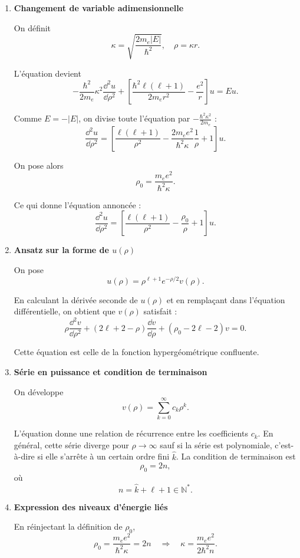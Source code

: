 \documentclass[a4paper,10pt]{report}
\begin{document}
\begin{enumerate}
		\item \textbf{Changement de variable adimensionnelle}
		
		On définit 
		\[
		\kappa = \sqrt{\frac{2m_e |E|}{\hbar^2}}, \quad \rho = \kappa r.
		\]
		
		L’équation devient
		\[
		-\frac{\hbar^2}{2m_e} \kappa^2 \frac{\dd^2 u}{\dd \rho^2} + \left[ \frac{\hbar^2 \ell(\ell+1)}{2m_e r^2} - \frac{e^2}{r} \right] u = E u.
		\]
		
		Comme $E = -|E|$, on divise toute l'équation par $-\frac{\hbar^2 \kappa^2}{2m_e}$ :
		\[
		\frac{\dd^2 u}{\dd \rho^2} = \left[ \frac{\ell(\ell+1)}{\rho^2} - \frac{2m_e e^2}{\hbar^2 \kappa} \frac{1}{\rho} + 1 \right] u.
		\]
		
		On pose alors 
		\[
		\rho_0 = \frac{m_e e^2}{\hbar^2 \kappa}.
		\]
		
		Ce qui donne l’équation annoncée :
		\[
		\frac{\dd^2 u}{\dd \rho^2} = \left[ \frac{\ell(\ell+1)}{\rho^2} - \frac{\rho_0}{\rho} + 1 \right] u.
		\]
		
		\item \textbf{Ansatz sur la forme de $u(\rho)$}
		
		On pose
		\[
		u(\rho) = \rho^{\ell+1} e^{-\rho/2} v(\rho).
		\]
		
		En calculant la dérivée seconde de $u(\rho)$ et en remplaçant dans l'équation différentielle, on obtient que $v(\rho)$ satisfait :
		\[
		\rho \frac{\dd^2 v}{\dd \rho^2} + (2\ell + 2 - \rho) \frac{\dd v}{\dd \rho} + (\rho_0 - 2\ell - 2) v = 0.
		\]
		
		Cette équation est celle de la fonction hypergéométrique confluente.
		
		\item \textbf{Série en puissance et condition de terminaison}
		
		On développe
		\[
		v(\rho) = \sum_{k=0}^\infty c_k \rho^k.
		\]
		
		L'équation donne une relation de récurrence entre les coefficients $c_k$. En général, cette série diverge pour $\rho \to \infty$ sauf si la série est polynomiale, c’est-à-dire si elle s’arrête à un certain ordre fini $\hat{k}$. La condition de terminaison est
		\[
		\rho_0 = 2 n,
		\]
		où 
		\[
		n = \hat{k} + \ell + 1 \in \mathbb{N}^*.
		\]
		
		\item \textbf{Expression des niveaux d’énergie liés}
		
		En réinjectant la définition de $\rho_0$,
		\[
		\rho_0 = \frac{m_e e^2}{\hbar^2 \kappa} = 2n \quad \Rightarrow \quad \kappa = \frac{m_e e^2}{2 \hbar^2 n}.
		\]
		

\end{enumerate}
\end{document}
